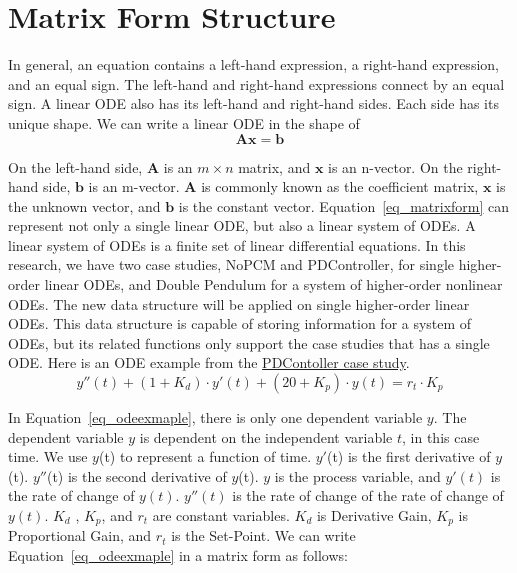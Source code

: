 \section{Matrix Form Structure}
In general, an equation contains a left-hand expression, a right-hand expression, and an equal sign. The left-hand and right-hand expressions connect by an equal sign. A linear ODE also has its left-hand and right-hand sides. Each side has its unique shape. We can write a linear ODE in the shape of
\begin{equation} \label{eq_matrixform}
	\boldsymbol{Ax} = \boldsymbol{b}
\end{equation}

On the left-hand side, $\boldsymbol{A}$ is an $m \times n$ matrix, and $\boldsymbol{x}$ is an n-vector. On the right-hand side, $\boldsymbol{b}$ is an m-vector. $\boldsymbol{A}$ is commonly known as the coefficient matrix, $\boldsymbol{x}$ is the unknown vector, and $\boldsymbol{b}$ is the constant vector. Equation~\ref{eq_matrixform} can represent not only a single linear ODE, but also a linear system of ODEs. A linear system of ODEs is a finite set of linear differential equations. In this research, we have two case studies, NoPCM and PDController, for single higher-order linear ODEs, and Double Pendulum for a system of higher-order nonlinear ODEs. The new data structure will be applied on single higher-order linear ODEs. This data structure is capable of storing information for a system of ODEs, but its related functions only support the case studies that has a single ODE. Here is an ODE example from the \href{https://jacquescarette.github.io/Drasil/examples/pdcontroller/SRS/srs/PDController_SRS.html#Sec:IMs}{PDContoller case study}.
\begin{equation} \label{eq_odeexmaple}
	y''(t) + (1 + K_d) \cdot y'(t) + (20 + K_p) \cdot y(t) = r_t \cdot K_p
\end{equation}

In Equation~\ref{eq_odeexmaple}, there is only one dependent variable $y$. The dependent variable $y$ is dependent on the independent variable $t$, in this case time. We use $y$(t) to represent a function of time. $y'$(t) is the first derivative of $y$(t). $y''$(t) is the second derivative of $y$(t). $y$ is the process variable, and $y'(t)$ is the rate of change of $y(t)$. $y''(t)$ is the rate of change of the rate of change of $y(t)$. $K_d$ , $K_p$, and $r_t$ are constant variables. $K_d$ is Derivative Gain, $K_p$ is Proportional Gain, and $r_t$ is the Set-Point. We can write Equation~\ref{eq_odeexmaple} in a matrix form as follows:

